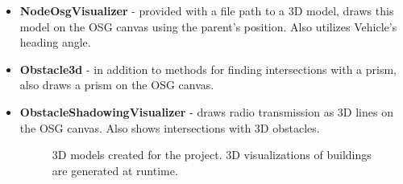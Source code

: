 \documentclass[]{nsm-thesis}
\begin{document}
\begin{itemize}

\item \textbf{NodeOsgVisualizer} - provided with a file path to a 3D model, draws this model on the \ac{OSG} canvas using the parent's position. Also utilizes Vehicle's heading angle. 

\item \textbf{Obstacle3d} - in addition to methods for finding intersections with a prism, also draws a prism on the \ac{OSG} canvas.

\item \textbf{ObstacleShadowingVisualizer} - draws radio transmission as 3D lines on the \ac{OSG} canvas. Also shows intersections with 3D obstacles. 

\begin{figure}%
    \centering
    \caption{3D models created for the project. 3D visualizations of buildings are generated at runtime.}%
    \label{fig:3dmodels}%
\end{figure}


\end{itemize}
\end{document}
